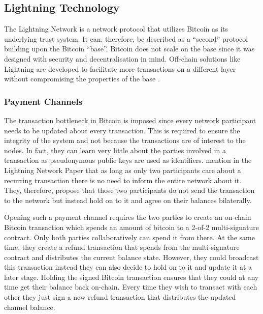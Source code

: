 \documentclass[final]{fhnwreport}       %
\begin{document}
\subsection{Lightning Technology}
The Lightning Network is a network protocol that utilizes Bitcoin as its underlying trust system. It can, therefore, be described as a ``\gls{second}'' protocol building upon the Bitcoin ``\gls{base}''. Bitcoin does not scale on the \gls{base} since it was designed with security and decentralisation in mind. Off-chain solutions like Lightning are developed to facilitate more transactions on a different layer without compromising the properties of the \gls{base} \citep{poon_bitcoin_2016}.

\subsubsection{Payment Channels}
The transaction bottleneck in Bitcoin is imposed since every network participant needs to be updated about every transaction. This is required to ensure the integrity of the system and not because the transactions are of interest to the nodes. In fact, they can learn very little about the parties involved in a transaction as \gls{pseudonymous} public keys are used as identifiers. \textcite{poon_bitcoin_2016} mention in the Lightning Network Paper that as long as only two participants care about a recurring transaction there is no need to inform the entire network about it. They, therefore, propose that those two participants do not send the transaction to the network but instead hold on to it and agree on their balances bilaterally. 

Opening such a payment channel requires the two parties to create an on-chain Bitcoin transaction which spends an amount of bitcoin to a 2-of-2 multi-signature contract. Only both parties collaboratively can spend it from there. At the same time, they create a refund transaction that spends from the multi-signature contract and distributes the current balance state. However, they could broadcast this transaction instead they can also decide to hold on to it and update it at a later stage. Holding the signed Bitcoin transaction ensures that they could at any time get their balance back on-chain. Every time they wish to transact with each other they just sign a new refund transaction that distributes the updated channel balance.
\end{document}
